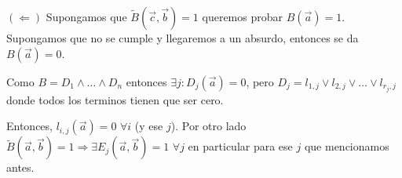 \documentclass[12pt,a4paper]{article}
\begin{document}
$(\Leftarrow)$ Supongamos que $\widetilde{B}(\overrightarrow{c}, \overrightarrow{b}) =1$ 
queremos probar $B(\overrightarrow{a}) = 1$. Supongamos que no se cumple y llegaremos 
a un absurdo, entonces se da $B(\overrightarrow{a}) = 0$.
\medskip

Como $B = D_{1} \wedge \ldots \wedge D_{n}$ entonces $\exists j : D_{j}(\overrightarrow{a}) = 0$, 
pero $D_{j} = l_{1,j} \vee l_{2,j} \vee \ldots \vee l_{r_{j},j}$ donde todos 
los terminos tienen que ser cero.
\medskip

Entonces, $l_{i,j}(\overrightarrow{a}) = 0\,\, \forall i$ (y ese $j$). Por otro 
lado $\widetilde{B}(\overrightarrow{a}, \overrightarrow{b}) = 1 \Rightarrow \exists E_{j}(\overrightarrow{a},\overrightarrow{b}) = 1\,\, \forall j$
en particular para ese $j$ que mencionamos antes.
\medskip
\end{document}
